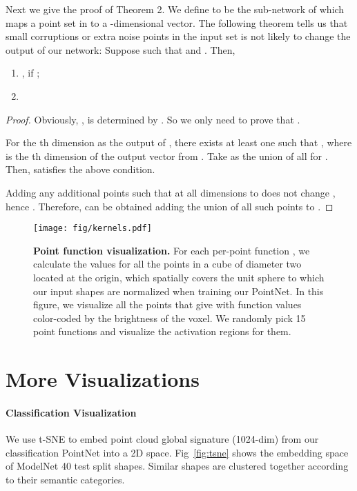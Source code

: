 \documentclass[10pt,twocolumn,letterpaper]{article}
\newenvironment{customthm}[1]
  {\renewcommand\theinnercustomthm{#1}\innercustomthm}
  {\endinnercustomthm}
\begin{document}
Next we give the proof of Theorem 2.
We define  to be the sub-network of  which maps a point set in  to a -dimensional vector. The following theorem tells us that small corruptions or extra noise points in the input set is not likely to change the output of our network:
\begin{customthm}{2}
Suppose  such that  and . Then, 
\begin{enumerate}[label=(\alph*)]   
    \item ,   if  ;
\item 
\end{enumerate}
\end{customthm}
\begin{proof}
Obviously, ,  is determined by . So we only need to prove that 
. 

For the th dimension as the output of , there exists at least one  such that , where  is the th dimension of the output vector from . Take  as the union of all  for . Then,  satisfies the above condition. 

Adding any additional points  such that  at all dimensions to  does not change , hence . Therefore,  can be obtained adding the union of all such points to .




\end{proof} 

\begin{figure}[h!]
    \centering
    \texttt{[image: fig/kernels.pdf]}
    \caption{\textbf{Point function visualization.} For each per-point function , we calculate the values  for all the points  in a cube of diameter two located at the origin, which spatially covers the unit sphere to which our input shapes are normalized when training our PointNet. In this figure, we visualize all the points  that give  with function values color-coded by the brightness of the voxel. We randomly pick 15 point functions and visualize the activation regions for them.}
    \label{fig:functions}
\end{figure}

\section{More Visualizations}
\label{sec:visu}
\paragraph{Classification Visualization}


We use t-SNE\cite{maaten2008visualizing} to embed point cloud global signature (1024-dim) from our classification PointNet into a 2D space. Fig~\ref{fig:tsne} shows the embedding space of ModelNet 40 test split shapes. Similar shapes are clustered together according to their semantic categories.
\end{document}

